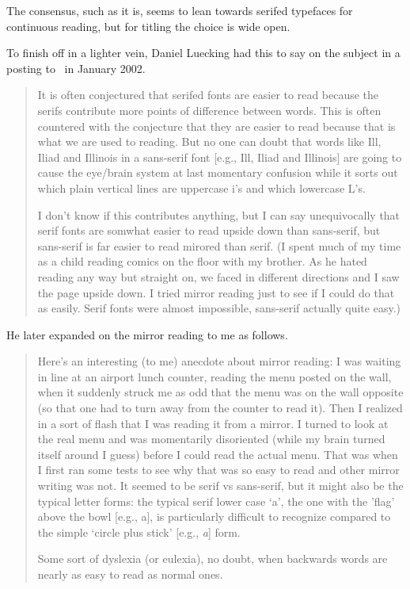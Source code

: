 \documentclass[10pt,letterpaper,extrafontsizes]{memoir}
\begin{document}
    The consensus, such as it is, seems to lean towards serifed
typefaces for continuous reading, but for titling the choice is
wide open.


    To finish off in a lighter vein,  
    Daniel Luecking had this to say on the subject
in a posting to \pixctt\ in January 2002.
\begin{quotation}
    It is often conjectured that serifed fonts are easier to read because
the serifs contribute more points of difference between words. This is
often countered with the conjecture that they are easier to read because 
that is what we are used to reading. But no one can doubt that words
like Ill, Iliad and Illinois in a sans-serif font 
[e.g., \textsf{Ill, Iliad and Illinois}] are going to cause the eye/brain 
system at last momentary confusion while it sorts out which plain vertical
lines are uppercase i's and which lowercase L's.

    I don't know if this contributes anything, but I can say unequivocally
that serif fonts are somwhat easier to read upside down than sans-serif,
but sans-serif is far easier to read mirored than serif. (I spent much
of my time as a child reading comics on the floor with my brother. As
he hated reading any way but straight on, we faced in different directions
and I saw the page upside down. I tried mirror reading just to see if
I could do that as easily. Serif fonts were almost impossible, sans-serif
actually quite easy.)

\end{quotation}

    He later expanded on the mirror reading to me as follows.
\begin{quotation}
Here's an interesting (to me) anecdote about mirror reading: I was waiting
in line at an airport lunch counter, reading the menu posted on the wall,
when it suddenly struck me as odd that the menu was on the wall opposite
(so that one had to turn away from the counter to read it). Then I
realized in a sort of flash that I was reading it from a mirror. I turned
to look at the real menu and was momentarily disoriented (while my brain
turned itself around I guess) before I could read the actual menu. That
was when I first ran some tests to see why that was so easy to read and
other mirror writing was not. It seemed to be serif vs sans-serif, but
it might also be the typical letter forms: the typical serif lower case
`a', the one with the 'flag' above the bowl [e.g., a], is particularly 
difficult to recognize compared to the simple `circle plus stick' 
[e.g., \textit{a}] form.

    Some sort of dyslexia (or eulexia), no doubt, when backwards
words are nearly as easy to read as normal ones.
\end{quotation}
\end{document}

